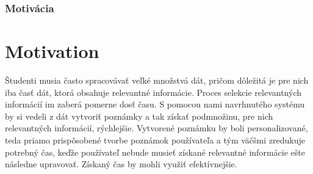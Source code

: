 {
	\subsection{Motivácia}
}
{
	\chapter{Motivation}
}
Študenti musia často spracovávať veľké množstvá dát, pričom dôležitá je pre nich iba časť dát, ktorá obsahuje relevantné informácie. Proces selekcie relevantných informácií im zaberá pomerne dosť času. S pomocou nami navrhnutého systému by si vedeli z dát vytvoriť poznámky a tak získať podmnožinu, pre nich relevantných informácií, rýchlejšie. Vytvorené poznámku by boli personalizované, teda priamo prispôsobené tvorbe poznámok používateľa a tým väčšmi zredukuje potrebný čas, keďže používateľ nebude musieť získané  relevantné informácie ešte následne upravovať. Získaný čas by mohli využiť efektívnejšie.

